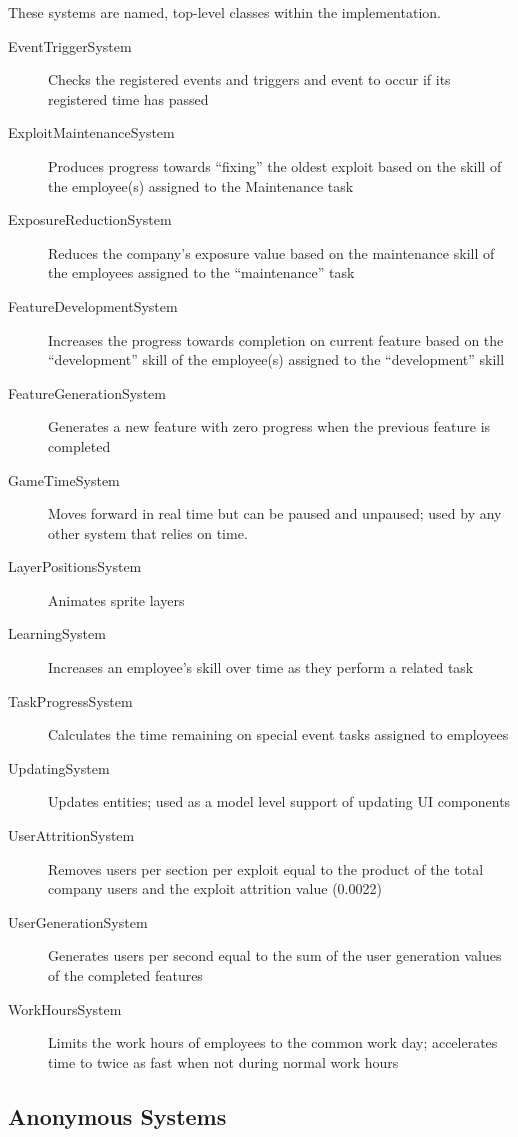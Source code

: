 \documentclass[letterpaper]{article}
\begin{document}
These systems are named, top-level classes within the implementation.

\begin{description}
\item[EventTriggerSystem]
 Checks the registered events and triggers and event to occur if its registered time has passed
\item[ExploitMaintenanceSystem] Produces progress towards ``fixing'' the oldest exploit based on the skill of the employee(s) assigned to the Maintenance task
\item[ExposureReductionSystem] Reduces the company’s exposure value based on the maintenance skill of the employees assigned to the “maintenance” task
\item[FeatureDevelopmentSystem] Increases the progress towards completion on current feature based on the “development” skill of the employee(s) assigned to the “development” skill
\item[FeatureGenerationSystem] Generates a new feature with zero progress when the previous feature is completed
\item[GameTimeSystem] Moves forward in real time but can be paused and unpaused; used by any other system that relies on time.
\item[LayerPositionsSystem] Animates sprite layers
\item[LearningSystem] Increases an employee’s skill over time as they perform a related task
\item[TaskProgressSystem] Calculates the time remaining on special event tasks assigned to employees
\item[UpdatingSystem] Updates entities; used as a model level support of updating UI components
\item[UserAttritionSystem] Removes users per section per exploit equal to the product of the total company users and the exploit attrition value (0.0022)
\item[UserGenerationSystem] Generates users per second equal to the sum of the user generation values of the completed features
\item[WorkHoursSystem] Limits the work hours of employees to the common work day; accelerates time to twice as fast when not during normal work hours
\end{description}

\subsection*{Anonymous Systems}
\end{document}
